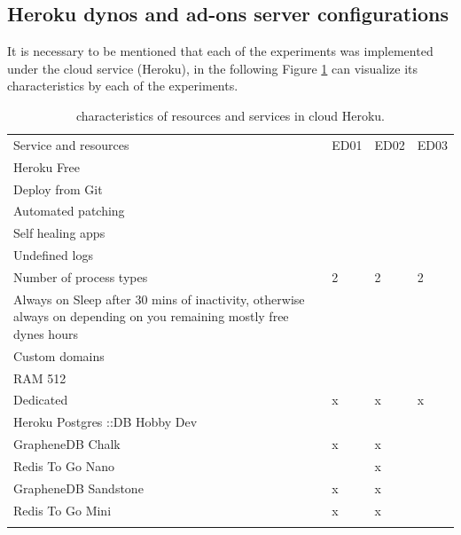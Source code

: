 \subsection{Heroku dynos and ad-ons server configurations}
It is necessary to be mentioned that each of the experiments was implemented
under the cloud service (Heroku), in the following Figure \ref{tab:heroku} can
visualize its characteristics by each of the experiments.
\begin{table}
	\small
	\caption{characteristics of  resources and services in cloud Heroku.	}
	\label{tab:heroku}
	\centering
	\small
	\begin{tabular}{p{4cm} p{3cm} p{3cm} p{3cm}  }
		\hline\noalign{\smallskip}
		Service and resources & ED01 & ED02 & ED03 \\
		\noalign{\smallskip}\hline\noalign{\smallskip}
		\small{Heroku Free} & \small{\checkmark} & \small{\checkmark} & \small{\checkmark}\\ \hline
		\small{Deploy from Git} & \small{\checkmark} & \small{\checkmark} & \small{\checkmark}\\ \hline
		\small{Automated patching} & \small{\checkmark} & \small{\checkmark} & \small{\checkmark}\\ \hline
		\small{Self healing apps} & \small{\checkmark} & \small{\checkmark} & \small{\checkmark}\\ \hline
		\small{Undefined logs} & \small{\checkmark} & \small{\checkmark} & \small{\checkmark}\\ \hline
		\small{Number of process types} & \small{2} & \small{2} & \small{2}\\ \hline
		\small{Always on Sleep after 30 mins of inactivity, otherwise always on depending on you remaining mostly free dynes hours} & \small{\checkmark} & \small{\checkmark} & \small{\checkmark}\\ \hline
		\small{Custom domains} & \small{\checkmark} & \small{\checkmark} & \small{\checkmark}\\ \hline
		\small{RAM 512} & \small{\checkmark} & \small{\checkmark} & \small{\checkmark}\\ \hline
		\small{Dedicated} & \small{x} & \small{x} & \small{x}\\ \hline
		\small{Heroku Postgres ::DB Hobby Dev} & \small{\checkmark} & \small{\checkmark} & \small{\checkmark}\\ \hline
		\small{GrapheneDB Chalk} & \small{x} & \small{x} & \small{\checkmark}\\ \hline
		\small{Redis To Go Nano} & \small{\checkmark} & \small{x} & \small{\checkmark}\\ \hline
		\small{GrapheneDB Sandstone} & \small{x} & \small{x} & \small{\checkmark}\\ \hline
		\small{Redis To Go Mini} & \small{x} & \small{x} & \small{\checkmark}\\ \hline


		\noalign{\smallskip}\hline
	\end{tabular}
\end{table}


